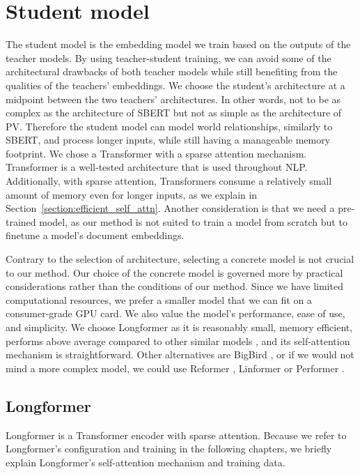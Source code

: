 \section{Student model}\label{section:student_model}

The student model is the embedding model we train based on the outputs of the teacher models. By using
teacher-student training, we can avoid some of the architectural drawbacks of
both teacher models while still benefiting from the qualities of the teachers'
embeddings. We choose the student's architecture at a midpoint between
the two teachers' architectures. In other words, not to be as complex as the
architecture of SBERT but not as simple as the architecture of PV. Therefore the student model
can model world relationships, similarly to SBERT, and process longer inputs, while still having a
manageable memory footprint. We chose a Transformer
with a sparse attention mechanism. Transformer is a well-tested architecture
that is used throughout NLP. Additionally, with sparse attention, Transformers
consume a relatively small amount of memory even for longer inputs, as we
explain in Section~\ref{section:efficient_self_attn}. Another consideration is
that we need a pre-trained model, as our method is not suited to train a model
from scratch but to finetune a model's document embeddings.

Contrary to the selection of architecture, selecting a concrete model is not
crucial to our method. Our choice of the concrete model is governed more by
practical considerations rather than the conditions of our method. Since we
have limited computational resources, we prefer a smaller model that we can fit
on a consumer-grade GPU card. We also value the model's performance, ease of
use, and simplicity. We choose Longformer \citep{beltagy2020longformer} as it
is reasonably small, memory efficient, performs above average compared to other
similar models \citep{tay2020long}, and its self-attention mechanism is
straightforward. Other alternatives are BigBird \citep{zaheer2020big}, or if we
would not mind a more complex model, we could use Reformer
\citep{kitaev2020reformer}, Linformer \citep{wang2020linformer} or Performer
\citep{choromanski2020rethinking}.

\subsection{Longformer}

Longformer \citep{beltagy2020longformer} is a Transformer encoder with sparse
attention. Because we refer to Longformer's configuration and training in the
following chapters, we briefly explain Longformer's self-attention mechanism
and training data.


